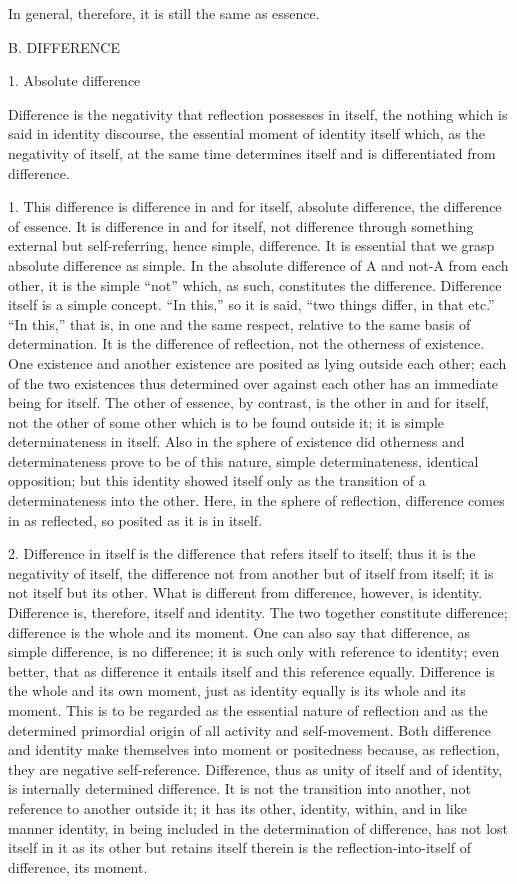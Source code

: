 In general, therefore,
it is still the same as essence.

B. DIFFERENCE

1. Absolute difference

Difference is the negativity that
reflection possesses in itself,
the nothing which is said in identity discourse,
the essential moment of identity itself
which, as the negativity of itself,
at the same time determines itself
and is differentiated from difference.

1. This difference is difference in and for itself,
absolute difference, the difference of essence.
It is difference in and for itself,
not difference through something external
but self-referring, hence simple, difference.
It is essential that we grasp absolute difference as simple.
In the absolute difference of A and not-A from each other,
it is the simple “not” which, as such,
constitutes the difference.
Difference itself is a simple concept.
“In this,” so it is said, “two things differ, in that etc.”
“In this,” that is, in one and the same respect,
relative to the same basis of determination.
It is the difference of reflection,
not the otherness of existence.
One existence and another existence are
posited as lying outside each other;
each of the two existences thus
determined over against each other
has an immediate being for itself.
The other of essence, by contrast,
is the other in and for itself,
not the other of some other
which is to be found outside it;
it is simple determinateness in itself.
Also in the sphere of existence
did otherness and determinateness
prove to be of this nature,
simple determinateness, identical opposition;
but this identity showed itself only as
the transition of a determinateness into the other.
Here, in the sphere of reflection,
difference comes in as reflected,
so posited as it is in itself.

2. Difference in itself is the difference
that refers itself to itself;
thus it is the negativity of itself,
the difference not from another
but of itself from itself;
it is not itself but its other.
What is different from difference, however, is identity.
Difference is, therefore, itself and identity.
The two together constitute difference;
difference is the whole and its moment.
One can also say that difference,
as simple difference, is no difference;
it is such only with reference to identity;
even better, that as difference it entails
itself and this reference equally.
Difference is the whole and its own moment,
just as identity equally is its whole and its moment.
This is to be regarded as
the essential nature of reflection
and as the determined primordial origin
of all activity and self-movement.
Both difference and identity make themselves
into moment or positedness
because, as reflection, they are negative self-reference.
Difference, thus as unity of itself and of identity,
is internally determined difference.
It is not the transition into another,
not reference to another outside it;
it has its other, identity, within,
and in like manner identity,
in being included in the determination of difference,
has not lost itself in it as its other
but retains itself therein is
the reflection-into-itself of difference, its moment.

